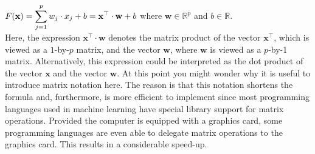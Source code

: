 $\displaystyle F(\mathbf{x}) = \sum\limits_{j=1}^p w_j \cdot x_j + b = \mathbf{x}^\top \cdot \mathbf{w} + b$ 
\quad where  $\mathbf{w} \in \mathbb{R}^p$ and $b\in\mathbb{R}$.
\\[0.2cm]
Here, the expression $\mathbf{x}^\top \cdot \mathbf{w}$ denotes the matrix product of the vector
$\mathbf{x}^\top$, which is viewed as a $1$-by-$p$ matrix, and the vector $\mathbf{w}$, where $\mathbf{w}$ is
viewed as a $p$-by-1 matrix.  Alternatively, this
expression could be interpreted as the dot product of the vector $\mathbf{x}$ and the vector $\mathbf{w}$.
At this point you might wonder why it is useful to introduce matrix notation here.  The reason is
that this notation shortens the formula and, furthermore, is more efficient to implement since most
programming languages used in machine learning have special library support for matrix operations.  
Provided the computer is equipped with a graphics card,  some
programming languages are even able to delegate matrix operations to the graphics card.  This results in a
considerable speed-up.

